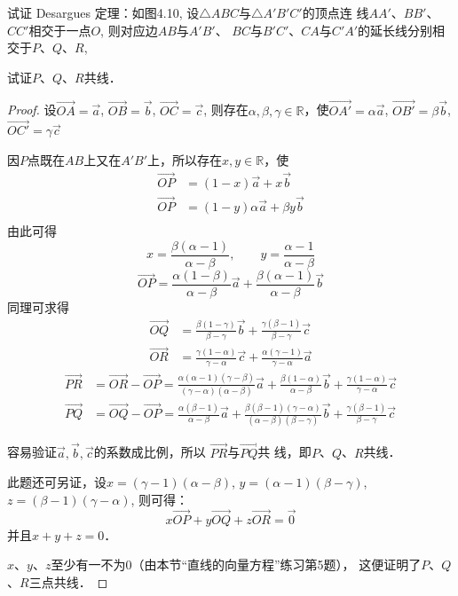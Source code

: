 \begin{example}
    试证 Desargues 定理：如图4.10, 设$\triangle ABC$与$\triangle A'B'C'$的顶点连
    线$AA'$、$BB'$、$CC'$相交于一点$O$, 则对应边$AB$与$A'B'$、
    $BC$与$B'C'$、$CA$与$C'A'$的延长线分别相交于$P$、$Q$、$R$, 
    
    试证$P$、$Q$、$R$共线．
\end{example}

\begin{proof}
    设$\Vec{OA}=\vec{a}$, $\Vec{OB}=\vec{b}$, $\Vec{OC}=\vec{c}$, 则存在$\alpha,\beta,\gamma\in \mathbb{R}$，使$\Vec{OA'}=\alpha\vec{a}$, $\Vec{OB'}=\beta\vec{b}$, $\Vec{OC'}=\gamma\vec{c}$

    因$P$点既在$AB$上又在$A'B'$上，所以存在$x,y\in\mathbb{R}$，使
\[\begin{split}
    \Vec{OP}&=(1-x)\vec{a}+x\vec{b}\\
    \Vec{OP}&=(1-y)\alpha\vec{a}+\beta y\vec{b}\\
\end{split}\]
由此可得
\[x=\frac{\beta(\alpha-1)}{\alpha-\beta},\qquad y=\frac{\alpha-1}{\alpha-\beta}\]
\begin{equation}
    \Vec{OP}=\frac{\alpha(1-\beta)}{\alpha-\beta}\vec{a}+\frac{\beta(\alpha-1)}{\alpha-\beta}\vec{b}
\end{equation}
同理可求得
\begin{align}
    \Vec{OQ}&=\frac{\beta(1-\gamma)}{\beta-\gamma}\vec{b}+\frac{\gamma(\beta-1)}{\beta-\gamma}\vec{c}\\
    \Vec{OR}&=\frac{\gamma(1-\alpha)}{\gamma-\alpha}\vec{c}+\frac{\alpha(\gamma-1)}{\gamma-\alpha}\vec{a}
\end{align}
\[\begin{split}
    \Vec{PR}&=\Vec{OR}-\Vec{OP}=\frac{\alpha(\alpha-1)(\gamma-\beta)}{(\gamma-\alpha)(\alpha-\beta)}\vec{a}+\frac{\beta(1-\alpha)}{\alpha-\beta}\vec{b}+\frac{\gamma(1-\alpha)}{\gamma-\alpha}\vec{c}\\
    \Vec{PQ}&=\Vec{OQ}-\Vec{OP}=\frac{\alpha(\beta-1)}{\alpha-\beta}\vec{a}+\frac{\beta(\beta-1)(\gamma-\alpha)}{(\alpha-\beta)(\beta-\gamma)}\vec{b}+\frac{\gamma(\beta-1)}{\beta-\gamma}\vec{c}
\end{split}\]

容易验证$\vec{a},\vec{b},\vec{c}$的系数成比例，所以
$\Vec{PR}$与$\Vec{PQ}$共
线，即$P$、$Q$、$R$共线．

此题还可另证，设$x=(\gamma-1)(\alpha-\beta)$,
 $y=(\alpha-1)(\beta-\gamma)$, $z=(\beta-1)(\gamma-\alpha)$, 则可得：
\[x\Vec{OP}+y\Vec{OQ}+z\Vec{OR}=\vec{0}\]
并且$x+y+z=0$．

$x$、$y$、$z$至少有一不为0（由本节“直线的向量方程”练习第5题），
这便证明了$P$、$Q$、$R$三点共线．
\end{proof}

